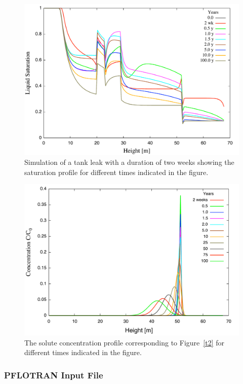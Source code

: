 \begin{figure}[h]\centering
\includegraphics[scale=0.45]{./figs/sat_leak}
\caption{Simulation of a tank leak with a duration of two weeks showing the saturation profile for different times indicated in the figure.}\label{f2}
\end{figure}

\begin{figure}[h]\centering
\includegraphics[scale=0.45]{./figs/conc}
\caption{The solute concentration profile corresponding to Figure~\ref{t2} for different times indicated in the figure.}\label{f3}
\end{figure}

\clearpage

\subsubsection{PFLOTRAN Input File}

